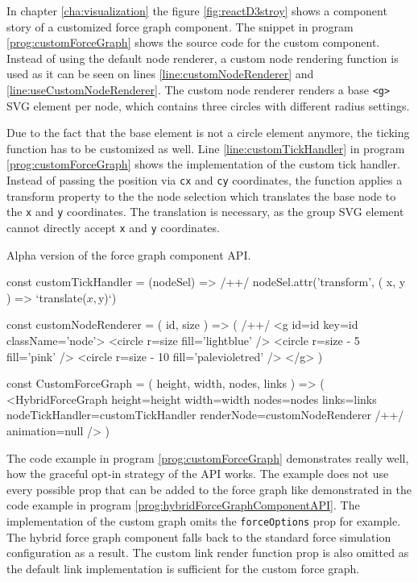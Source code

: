 In chapter \ref{cha:visualization} the figure \ref{fig:reactD3stroy} shows a component story of a customized force graph component. The snippet in program \ref{prog:customForceGraph} shows the source code for the custom component. Instead of using the default node renderer, a custom node rendering function is used as it can be seen on lines \ref{line:customNodeRenderer} and \ref{line:useCustomNodeRenderer}. The custom node renderer renders a base \texttt{<g>} SVG element per node, which contains three circles with different radius settings.

Due to the fact that the base element is not a circle element anymore, the ticking function has to be customized as well. Line \ref{line:customTickHandler} in program \ref{prog:customForceGraph} shows the implementation of the custom tick handler. Instead of passing the position via \texttt{cx} and \texttt{cy} coordinates, the function applies a transform property to the the node selection which translates the base node to the \texttt{x} and \texttt{y} coordinates. The translation is necessary, as the group SVG element cannot directly accept \texttt{x} and \texttt{y} coordinates.

\begin{program}
\caption{Alpha version of the force graph component API.}
\label{prog:customForceGraph}
\begin{JsCode}
const customTickHandler = (nodeSel) => /+\label{line:customTickHandler}+/ 
  nodeSel.attr('transform', ({ x, y }) => `translate(${x},${y})`)

const customNodeRenderer = ({ id, size }) => ( /+\label{line:customNodeRenderer}+/ 
  <g id={id} key={id} className={'node'}>
    <circle r={size} fill={'lightblue'} />
    <circle r={size - 5} fill={'pink'} />
    <circle r={size - 10} fill={'palevioletred'} />
  </g>
)

const CustomForceGraph = ({ height, width, nodes, links }) => (
  <HybridForceGraph
    height={height}
    width={width}
    nodes={nodes}
    links={links}
    nodeTickHandler={customTickHandler}
    renderNode={customNodeRenderer} /+\label{line:useCustomNodeRenderer}+/ 
    animation={null}
  />
)
\end{JsCode}
\end{program}

The code example in program \ref{prog:customForceGraph} demonstrates really well, how the graceful opt-in strategy of the API works. The example does not use every possible prop that can be added to the force graph like demonstrated in the code example in program \ref{prog:hybridForceGraphComponentAPI}. The implementation of the custom graph omits the \texttt{forceOptions} prop for example. The hybrid force graph component falls back to the standard force simulation configuration as a result. The custom link render function prop is also omitted as the default link implementation is sufficient for the custom force graph.

